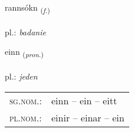 \documentclass[frontgrid, backgrid]{flacards}\usepackage[]{graphicx}\usepackage[]{xcolor}
\begin{document}
\renewcommand{\blhead}{\vskip5pt {\small\bfseries\footnotesize Nafnorð | Noun }}
\renewcommand{\bcfoot}{\vskip5pt \hspace{2pt}{\small\bfseries\footnotesize 1K}}


{rannsókn \small{\textsubscript{(\textit{f.})}} \\[1ex] %
\textphonetic{[ransouhkn̥]} \\
pl.: \emph{badanie} \\  [2ex]
\renewcommand*{\arraystretch}{0.8}
}

\renewcommand{\flhead}{\vskip5pt \fboxsep=0pt {\small\bfseries\footnotesize Fornafn | Pronoun}}
\renewcommand{\fcfoot}{\vskip5pt \fboxsep=0pt \hspace{2pt}{\small\bfseries\footnotesize 1K}}

\renewcommand{\blhead}{\vskip5pt {\small\bfseries\footnotesize Fornafn | Pronoun }}
\renewcommand{\bcfoot}{\vskip5pt \hspace{2pt}{\small\bfseries\footnotesize 1K}}


{einn \small{\textsubscript{(\textit{pron.})}} \\[1ex] %
\textphonetic{[eitn̥]} \\
pl.: \emph{jeden} \\  [2ex]
\renewcommand*{\arraystretch}{0.8}
\begin{tabular}{ll}
\textsc{sg.nom.}: & einn  --  ein -- eitt \\ 
\textsc{pl.nom.}: & einir -- einar -- ein
\end{tabular}
}

\renewcommand{\flhead}{\vskip5pt \fboxsep=0pt {\small\bfseries\footnotesize Lýsingarorð | Adjective}}
\renewcommand{\fcfoot}{\vskip5pt \fboxsep=0pt \hspace{2pt}{\small\bfseries\footnotesize 1K}}
\end{document}
